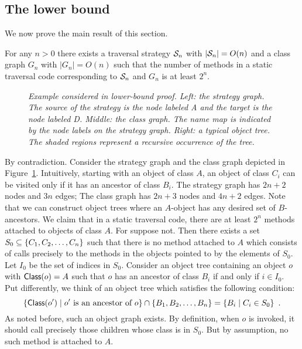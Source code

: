\subsection{The lower bound}
We now prove the main result of this section.
\begin{theorem}
\label{thm-lb}
For any $n>0$ there exists a traversal strategy ${\cal S}_n$ with
$|{\cal S}_n|=O(n)$ and a class graph $G_n$ with $|G_n|=O(n)$ such that the
number of methods in a static traversal code corresponding to ${\cal S}_n$
and $G_n$ is at least $2^n$.
\end{theorem}
\begin{figure}
\newlength{\figwidth}
\setlength{\figwidth}{\textwidth}
\addtolength{\figwidth}{-5mm}
\centerline{}
\caption{\em 
Example considered in lower-bound proof.  Left: the strategy
graph. The source of the strategy is the node labeled {\sf A} and the
target is the node labeled {\sf D}.  Middle: the class graph. The name
map is indicated by the node labels on the strategy graph. Right: a
typical object tree. The shaded regions represent a recursive
occurrence of the tree.  }
\label{fig-lb}
\end{figure}
\Proof
By contradiction.  Consider the strategy graph and the class graph
depicted in Figure~\ref{fig-lb}. Intuitively, starting with an object
of class $A$, an object of class $C_i$ can be visited only if it has
an ancestor of class $B_i$.  The strategy graph has $2n+2$ nodes and
$3n$ edges; The class graph has $2n+3$ nodes and $4n+2$ edges.  Note
that we can construct object trees where an $A$-object has any desired
set of $B$-ancestors.  We claim that in a static traversal code, there
are at least $2^n$ methods attached to objects of class $A$.  For
suppose not.  Then there exists a set
$S_0\subseteq\left\{ C_1,C_2,\ldots,C_n \right\}$ such that there is no method
attached to $A$ which consists of calls precisely to the methods in
the objects pointed to by the elements of $S_0$. Let $I_0$ be the set
of indices in $S_0$.  Consider an object tree containing an object $o$
with $\mbox{\sf Class}(o)=A$ such that $o$ has an ancestor of class $B_i$ if and
only if $i\in I_0$. Put differently, we think of an object tree which
satisfies the following condition: $$
\left\{ \mbox{\sf Class}(o')\mid o' \mbox{ is an ancestor of }o \right\}\cap
\left\{ B_1,B_2,\ldots,B_n \right\}= \left\{ B_i\mid C_i\in S_0 \right\}~.
$$
As noted before, such an object graph exists.  By definition, when $o$
is invoked, it should call precisely those children whose class is in
$S_0$. But by assumption, no such method is attached to $A$.
\QED

